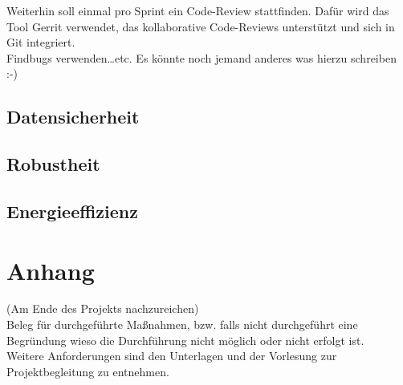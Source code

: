 \documentclass[accentcolor=tud0b,12pt,paper=a4]{tudreport}
\begin{document}
                Weiterhin soll einmal pro Sprint ein Code-Review stattfinden. Dafür wird das Tool Gerrit verwendet, das kollaborative Code-Reviews unterstützt und sich in Git integriert.\\

                Findbugs verwenden\ldots etc. Es könnte noch jemand anderes was hierzu schreiben :-)

        \section{Datensicherheit}

        \section{Robustheit}

        \section{Energieeffizienz}
	        
	
\appendix	
	\chapter{Anhang}
		(Am Ende des Projekts nachzureichen)\\
		Beleg für durchgeführte Maßnahmen, bzw. falls nicht durchgeführt eine Begründung wieso die Durchführung nicht möglich oder nicht erfolgt ist. \\
		Weitere Anforderungen sind den Unterlagen und der Vorlesung zur Projektbegleitung zu entnehmen.
	
\end{document}
